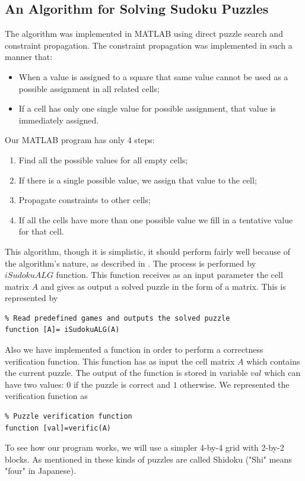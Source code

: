 \documentclass[12pt,a4paper]{article} %
\begin{document}
\subsection{An Algorithm for Solving Sudoku Puzzles}
The algorithm was implemented in MATLAB using direct puzzle search and constraint propagation. The constraint propagation was implemented in such a manner that: 
\begin{itemize}
\item When a value is assigned to a square that same value cannot be used as a possible assignment in all related cells;
\item If a cell has only one single value for possible assignment, that value is immediately assigned.
\end{itemize}
Our MATLAB program has only 4 steps:
\begin{enumerate}
\item Find all the possible values for all empty cells;
\item If there is a single possible value, we assign that value to the cell;
\item Propagate constraints to other cells;
\item If all the cells have more than one possible value we fill in a tentative value for that cell.
\end{enumerate}
This algorithm, though it is simplistic, it should perform fairly well  because of the algorithm's nature, as described in \cite{norvigsolving}. The process is performed by $iSudokuALG$ function. This function receives as an input parameter the cell matrix $A$ and gives as output a solved puzzle in the form of a matrix. This is represented by
\begin{verbatim}
% Read predefined games and outputs the solved puzzle
function [A]= iSudokuALG(A)
\end{verbatim}
Also we have implemented a function in order to perform a correctness verification function. This function has as input the cell matrix $A$ which contains the current puzzle. The output of the function is stored in variable $val$ which can have two values: $0$ if the puzzle is correct and $1$ otherwise. We represented the verification function as
\begin{verbatim}
% Puzzle verification function
function [val]=verific(A)
\end{verbatim}
To see how our program works, we will use a simpler 4-by-4 grid with 2-by-2 blocks. As mentioned in \cite{crook2009pencil} these kinds of puzzles are called Shidoku ("Shi" means "four" in Japanese). 
\end{document}
